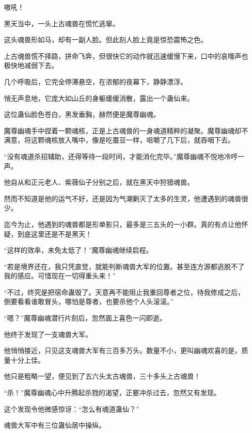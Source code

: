 
\begin{this_body}



嗷吼！

黑天当中，一头上古魂兽在慌忙逃窜。

这头魂兽形如马，却有一副人脸。但此刻人脸上竟是惊恐震怖之色。

上古魂兽慌不择路，拼命飞奔，但很快它的动作就迅速缓慢下来，口中的哀嚎声也极快地减弱下去。

几个呼吸后，它完全停滞悬空，在浓郁的夜幕下，静静漂浮。

悄无声息地，它庞大如山丘的身躯缓缓消散，露出一个蛊仙来。

这位蛊仙脸色苍白，黑发垂胸，赫然便是魔尊幽魂。

魔尊幽魂手中捏着一颗魂核，正是上古魂兽的一身魂道精粹的凝聚。魔尊幽魂却不满意，将这颗魂核放入嘴中，像是吃蚕豆一样，咀嚼了几下后，就吞咽下去。

“没有魂道杀招辅助，还得等待一段时间，才能消化完毕。”魔尊幽魂不悦地冷哼一声。

他自从和正元老人、紫薇仙子分别之后，就在黑天中狩猎魂兽。

然而不知道是他的运气不好，还是因为气潮剿灭了太多的生灵，他遭遇到的魂兽很少。

迄今为止，他遇到的魂兽都是形单影只，最多是三五头的一小群。真的有点让他怀疑，到底这里还是不是黑天！

“这样的效率，未免太低了！”魔尊幽魂继续启程。

“若是境界还在，我只凭直觉，就能判断魂兽大军的位置。甚至连方源都逃脱不了我的感应。可惜现在一切得重头来！”

“不过，终究是把宿命蛊毁了。天意再不能阻止我重回尊者之位，待我修成之后，倒要看看谁敢冒头，哪怕是尊者，也要杀他个人头滚滚。”

“嗯？”魔尊幽魂潜行片刻后，忽然面上喜色一闪即逝。

他终于发现了一支魂兽大军。

他悄悄接近，只见这支魂兽大军有三百多万头。数量不小，更叫幽魂欢喜的是，质量十分上佳。

他只是粗略一望，便见到了五六头太古魂兽，三十多头上古魂兽！

“杀！”魔尊幽魂心中升腾起杀戮的渴望，正要冲杀过去，忽然又有发现。

这个发现令他微感惊讶：“怎么有魂道蛊仙？”

魂兽大军中有三位蛊仙居中操纵。


\end{this_body}
